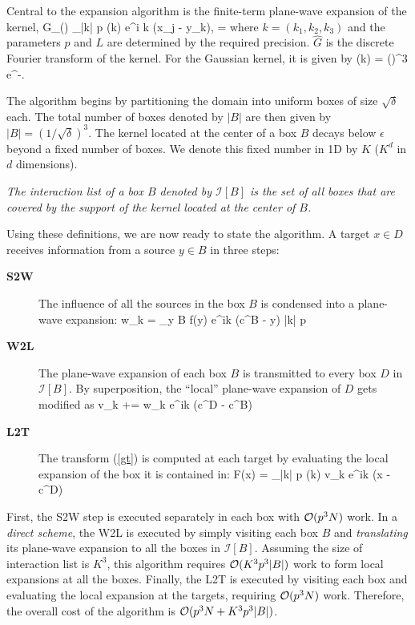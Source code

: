 Central to the expansion algorithm is the finite-term plane-wave expansion of the kernel,
\beq G_\delta() \approx \sum_{|k| \leq p} (k) e^{i \lambda k \cdot (x_j - y_k)}, \quad \lambda = \eeq
where $k = (k_1, k_2, k_3)$ and the parameters $p$ and $L$ are determined by the required precision. $\hat{G}$ is the discrete Fourier transform of the kernel. For the Gaussian kernel, it is given by
\beq {}(k) = \left(\right)^3 e^{-}. \label{eqn:ghat}\eeq

The algorithm begins by partitioning the domain into uniform boxes of size $\sqrt{\delta}$ each. The total number of boxes denoted by $|B|$ are then given by $|B| = (1/\sqrt{\delta})^3$. The kernel located at the center of a box $B$ decays below $\epsilon$ beyond a fixed number of boxes. We denote this fixed number in 1D by $K$ ($K^d$ in $d$ dimensions). 

\begin{mydef} {\em The interaction list of a box $B$ denoted by $\mathcal{I}[B]$ is the set of all boxes that are covered by the support of the kernel located at the center of $B$. }
\end{mydef} 
%
Using these definitions, we are now ready to state the algorithm. A target $x \in D$ receives information from a source $y \in B$ in three steps:
\begin{description}
\item[\textbf{S2W}] The influence of all the sources in the box $B$ is condensed into a plane-wave expansion:
            \beq w_k = \sum_{y \in B} f(y) e^{i\lambda k \cdot (c^B - y)} \quad \forall\quad |k| \leq p  \label{eqn:s2w} \eeq
            
\item[\textbf{W2L}] The plane-wave expansion of each box $B$ is transmitted to every box $D$ in $\mathcal{I}[B]$. By
 superposition, the ``local'' plane-wave expansion of $D$ gets modified as
            \beq v_k += w_k e^{i\lambda k \cdot (c^D - c^B)} \label{e:w2l}\eeq
            
\item[\textbf{L2T}] The transform (\ref{gt}) is computed at each target by evaluating the local expansion of the 
box it is contained in:
            \beq F(x) = \sum_{|k| \leq p} (k) v_k e^{i\lambda k \cdot (x - c^D)} \label{eqn:l2t}\eeq
\end{description} 

First, the S2W step is executed separately in each box with $\mathcal{O}(p^3 N)$ work. In a {\em direct scheme}, 
the W2L is executed by simply visiting each box $B$ and {\em translating} its plane-wave expansion to all the boxes
 in $\mathcal{I}[B]$. Assuming the size of interaction list is $K^3$, this algorithm requires $\mathcal{O}(K^3 p^3 |B|)$ work 
 to form local expansions at all the boxes. Finally, the L2T is executed by visiting each box and evaluating the 
 local expansion at the targets, requiring $\mathcal{O}(p^3 N)$ work. Therefore, the overall cost of the algorithm is $\mathcal{O}(p^3 N + K^3 p^3 |B|)$.  

